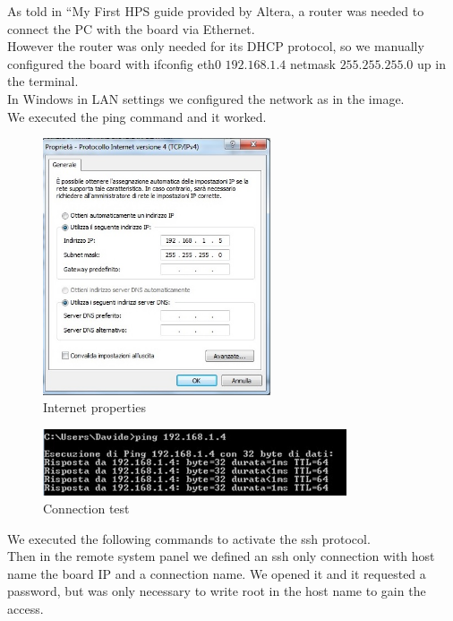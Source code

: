 As told in “My First HPS guide provided by Altera, a router was needed to connect the PC with the board via Ethernet.\\
However the router was only needed for its DHCP protocol, so we manually configured the board with ifconfig eth0 $192.168.1.4$ netmask $255.255.255.0$ up in the terminal.\\
In Windows in LAN settings we configured the network as in the image.\\
We executed the ping command and it worked.
\clearpage

\begin{figure}[h]
	\centering		\includegraphics[width=0.6\textwidth]{img/internetprop}
	\caption{Internet properties}
    	\label{fig:internetprop}
\end{figure}

\begin{figure}[h]
	\centering		\includegraphics[width=0.8\textwidth]{img/ping}
	\caption{Connection test}
    	\label{fig:ping}
\end{figure}

\clearpage
We executed the following commands to activate the ssh protocol.\\
Then in the remote system panel  we defined an ssh only connection with host name the board IP and a connection name. We opened it and it requested a password, but was only necessary to write root in the host name to gain the access.\\

